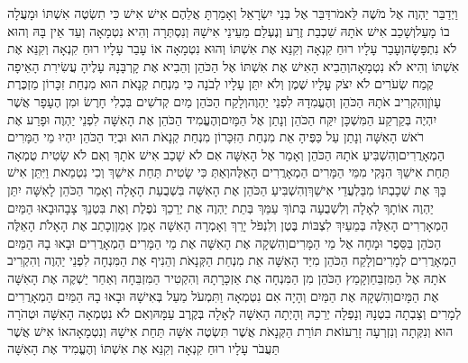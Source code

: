 \documentclass[../main/main.tex]{subfiles}
\begin{document}
\begin{multicols}{\ncols}
וַיְדַבֵּר יַהְוֶה אֶל מֹשֶׁה לֵּאמֹר\PreVerseSpace{}דַּבֵּר אֶל בְּנֵי יִשְׂרָאֵל וְאָמַרְתָּ אֲלֵהֶם אִישׁ אִישׁ כִּי תִשְׂטֶה אִשְׁתּוֹ וּמָעֲלָה בוֹ מָעַל\PreVerseSpace{}וְשָׁכַב אִישׁ אֹתָהּ שִׁכְבַת זֶרַע וְנֶעְלַם מֵעֵינֵי אִישָׁהּ וְנִסְתְּרָה וְהִיא נִטְמָאָה וְעֵד אֵין בָּהּ וְהוּא לֹא נִתְפָּשָׂה\PreVerseSpace{}וְעָבַר עָלָיו רוּחַ קִנְאָה וְקִנֵּא אֶת אִשְׁתּוֹ וְהוּא נִטְמָאָה אוֹ עָבַר עָלָיו רוּחַ קִנְאָה וְקִנֵּא אֶת אִשְׁתּוֹ וְהִיא לֹא נִטְמָאָה\PreVerseSpace{}וְהֵבִיא הָאִישׁ אֶת אִשְׁתּוֹ אֶל הַכֹּהֵן וְהֵבִיא אֶת קָרְבָּנָהּ עָלֶיהָ עֲשִׂירִת הָאֵיפָה קֶמַח שְׂעֹרִים לֹא יִצֹק עָלָיו שֶׁמֶן וְלֹא יִתֵּן עָלָיו לְבֹנָה כִּי מִנְחַת קְנָאֹת הוּא מִנְחַת זִכָּרוֹן מַזְכֶּרֶת עָוֺן\PreVerseSpace{}וְהִקְרִיב אֹתָהּ הַכֹּהֵן וְהֶעֱמִדָהּ לִפְנֵי יַהְוֶה\PreVerseSpace{}וְלָקַח הַכֹּהֵן מַיִם קְדֹשִׁים בִּכְלִי חָרֶשׂ וּמִן הֶעָפָר אֲשֶׁר יִהְיֶה בְּקַרְקַע הַמִּשְׁכָּן יִקַּח הַכֹּהֵן וְנָתַן אֶל הַמָּיִם\PreVerseSpace{}וְהֶעֱמִיד הַכֹּהֵן אֶת הָאִשָּׁה לִפְנֵי יַהְוֶה וּפָרַע אֶת רֹאשׁ הָאִשָּׁה וְנָתַן עַל כַּפֶּיהָ אֵת מִנְחַת הַזִּכָּרוֹן מִנְחַת קְנָאֹת הוּא וּבְיַד הַכֹּהֵן יִהְיוּ מֵי הַמָּרִים הַמְאָרֲרִים\PreVerseSpace{}וְהִשְׁבִּיעַ אֹתָהּ הַכֹּהֵן וְאָמַר אֶל הָאִשָּׁה אִם לֹא שָׁכַב אִישׁ אֹתָךְ וְאִם לֹא שָׂטִית טֻמְאָה תַּחַת אִישֵׁךְ הִנָּקִי מִמֵּי הַמָּרִים הַמְאָרֲרִים הָאֵלֶּה\PreVerseSpace{}וְאַתְּ כִּי שָׂטִית תַּחַת אִישֵׁךְ וְכִי נִטְמֵאת וַיִּתֵּן אִישׁ בָּךְ אֶת שְׁכָבְתּוֹ מִבַּלְעֲדֵי אִישֵׁךְ\PreVerseSpace{}וְהִשְׁבִּיעַ הַכֹּהֵן אֶת הָאִשָּׁה בִּשְׁבֻעַת הָאָלָה וְאָמַר הַכֹּהֵן לָאִשָּׁה יִתֵּן יַהְוֶה אוֹתָךְ לְאָלָה וְלִשְׁבֻעָה בְּתוֹךְ עַמֵּךְ בְּתֵת יַהְוֶה אֶת יְרֵכֵךְ נֹפֶלֶת וְאֶת בִּטְנֵךְ צָבָה\PreVerseSpace{}וּבָאוּ הַמַּיִם הַמְאָרְרִים הָאֵלֶּה בְּמֵעַיִךְ לִצְבּוֹת\SubEnd{} בֶּטֶן וְלִנְפֹּל\SubEnd{} יָרֵךְ וְאָמְרָה הָאִשָּׁה אָמֵן אָמֵן\PreVerseSpace{}וְכָתַב אֶת הָאָלֹת הָאֵלֶּה הַכֹּהֵן בַּסֵּפֶר וּמָחָה אֶל מֵי הַמָּרִים\PreVerseSpace{}וְהִשְׁקָה אֶת הָאִשָּׁה אֶת מֵי הַמָּרִים הַמְאָרֲרִים וּבָאוּ בָהּ הַמַּיִם הַמְאָרֲרִים לְמָרִים\PreVerseSpace{}וְלָקַח הַכֹּהֵן מִיַּד הָאִשָּׁה אֵת מִנְחַת הַקְּנָאֹת וְהֵנִיף אֶת הַמִּנְחָה לִפְנֵי יַהְוֶה וְהִקְרִיב אֹתָהּ אֶל הַמִּזְבֵּחַ\PreVerseSpace{}וְקָמַץ הַכֹּהֵן מִן הַמִּנְחָה אֶת אַזְכָּרָתָהּ וְהִקְטִיר הַמִּזְבֵּחָה וְאַחַר יַשְׁקֶה אֶת הָאִשָּׁה אֶת הַמָּיִם\PreVerseSpace{}וְהִשְׁקָהּ אֶת הַמַּיִם וְהָיָה\SubEnd{} אִם נִטְמְאָה וַתִּמְעֹל מַעַל בְּאִישָׁהּ וּבָאוּ בָהּ הַמַּיִם הַמְאָרֲרִים לְמָרִים וְצָבְתָה בִטְנָהּ וְנָפְלָה יְרֵכָהּ וְהָיְתָה הָאִשָּׁה לְאָלָה בְּקֶרֶב עַמָּהּ\PreVerseSpace{}וְאִם לֹא נִטְמְאָה הָאִשָּׁה וּטְהֹרָה הוּא וְנִקְּתָה וְנִזְרְעָה זָרַע\PreVerseSpace{}זֹאת תּוֹרַת הַקְּנָאֹת אֲשֶׁר תִּשְׂטֶה אִשָּׁה תַּחַת אִישָׁהּ וְנִטְמָאָה\PreVerseSpace{}אוֹ אִישׁ אֲשֶׁר תַּעֲבֹר עָלָיו רוּחַ קִנְאָה וְקִנֵּא אֶת אִשְׁתּוֹ וְהֶעֱמִיד אֶת הָאִשָּׁה 
\end{multicols}
\end{document}
